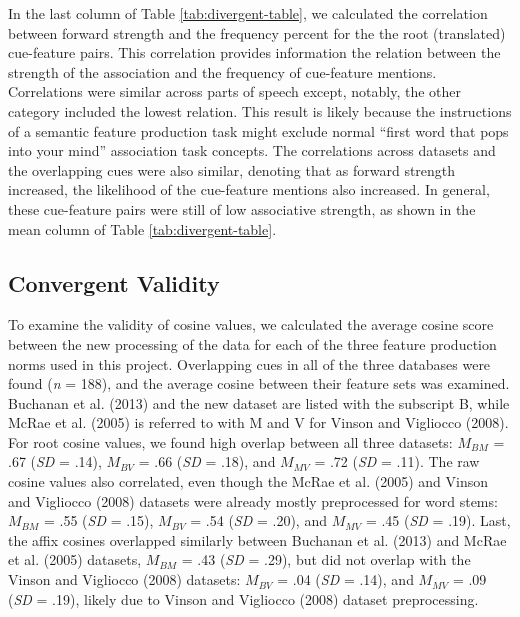 \documentclass[english,,man]{apa6}
\theoremstyle{definition}
\theoremstyle{definition}
\theoremstyle{definition}
\theoremstyle{remark}
\begin{document}
In the last column of Table \ref{tab:divergent-table}, we calculated the
correlation between forward strength and the frequency percent for the
the root (translated) cue-feature pairs. This correlation provides
information the relation between the strength of the association and the
frequency of cue-feature mentions. Correlations were similar across
parts of speech except, notably, the other category included the lowest
relation. This result is likely because the instructions of a semantic
feature production task might exclude normal \enquote{first word that
pops into your mind} association task concepts. The correlations across
datasets and the overlapping cues were also similar, denoting that as
forward strength increased, the likelihood of the cue-feature mentions
also increased. In general, these cue-feature pairs were still of low
associative strength, as shown in the mean column of Table
\ref{tab:divergent-table}.

\subsection{Convergent Validity}\label{convergent-validity}

To examine the validity of cosine values, we calculated the average
cosine score between the new processing of the data for each of the
three feature production norms used in this project. Overlapping cues in
all of the three databases were found (\emph{n} = 188), and the average
cosine between their feature sets was examined. Buchanan et al. (2013)
and the new dataset are listed with the subscript B, while McRae et al.
(2005) is referred to with M and V for Vinson and Vigliocco (2008). For
root cosine values, we found high overlap between all three datasets:
\(M_{BM}\) = .67 (\emph{SD} = .14), \(M_{BV}\) = .66 (\emph{SD} = .18),
and \(M_{MV}\) = .72 (\emph{SD} = .11). The raw cosine values also
correlated, even though the McRae et al. (2005) and Vinson and Vigliocco
(2008) datasets were already mostly preprocessed for word stems:
\(M_{BM}\) = .55 (\emph{SD} = .15), \(M_{BV}\) = .54 (\emph{SD} = .20),
and \(M_{MV}\) = .45 (\emph{SD} = .19). Last, the affix cosines
overlapped similarly between Buchanan et al. (2013) and McRae et al.
(2005) datasets, \(M_{BM}\) = .43 (\emph{SD} = .29), but did not overlap
with the Vinson and Vigliocco (2008) datasets: \(M_{BV}\) = .04
(\emph{SD} = .14), and \(M_{MV}\) = .09 (\emph{SD} = .19), likely due to
Vinson and Vigliocco (2008) dataset preprocessing.
\end{document}
